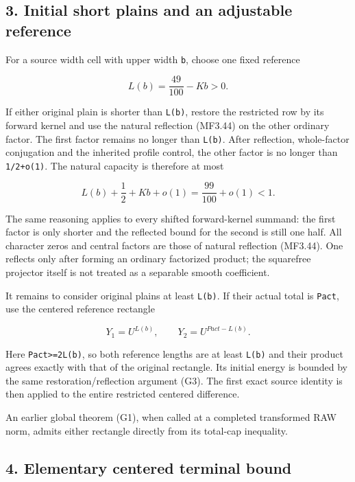 \hypertarget{sources:initial-short-plains-and-an-adjustable-reference}{%
\subsection{3. Initial short plains and an adjustable reference}\label{sources:initial-short-plains-and-an-adjustable-reference}}

For a source width cell with upper width \texttt{b}, choose one fixed reference

\[
 L(b)=\frac{49}{100}-Kb>0.
\tag{G2}
\]

If either original plain is shorter than \texttt{L(b)}, restore the restricted row by its forward kernel and use the natural reflection (MF3.44) on the other ordinary factor. The first factor remains no longer than \texttt{L(b)}. After reflection, whole-factor conjugation and the inherited profile control, the other factor is no longer than \texttt{1/2+o(1)}. The natural capacity is therefore at most

\[
 L(b)+\frac12+Kb+o(1)=\frac{99}{100}+o(1)<1.
\tag{G3}
\]

The same reasoning applies to every shifted forward-kernel summand: the first factor is only shorter and the reflected bound for the second is still one half. All character zeros and central factors are those of natural reflection (MF3.44). One reflects only after forming an ordinary factorized product; the squarefree projector itself is not treated as a separable smooth coefficient.

It remains to consider original plains at least \texttt{L(b)}. If their actual total is \texttt{Pact}, use the centered reference rectangle

\[
 Y_1=U^{L(b)},\qquad Y_2=U^{Pact-L(b)}.
\tag{G4}
\]

Here \texttt{Pact\textgreater{}=2L(b)}, so both reference lengths are at least \texttt{L(b)} and their product agrees exactly with that of the original rectangle. Its initial energy is bounded by the same restoration/reflection argument (G3). The first exact source identity is then applied to the entire restricted centered difference.

An earlier global theorem (G1), when called at a completed transformed RAW norm, admits either rectangle directly from its total-cap inequality.

\hypertarget{sources:elementary-centered-terminal-bound}{%
\subsection{4. Elementary centered terminal bound}\label{sources:elementary-centered-terminal-bound}}

